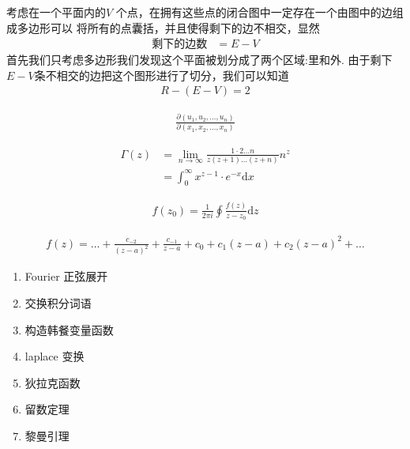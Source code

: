 \begin{thm}
考虑在一个平面内的$ V $ 个点，在拥有这些点的闭合图中一定存在一个由图中的边组成多边形可以
将所有的点囊括，并且使得剩下的边不相交，显然
\begin{align*}
		\text{剩下的边数}&= E-V 
\end{align*}
首先我们只考虑多边形我们发现这个平面被划分成了两个区域:里和外.
由于剩下$ E-V $条不相交的边把这个图形进行了切分，我们可以知道
 \begin{align*}
		R-(E-V) = 2
\end{align*}
\end{thm}
\begin{thm}
		\begin{align*}
				\frac{\partial (u_1,u_2,\ldots,u_n)}{\partial (x_1,x_2,\ldots,x_{n})} 
		\end{align*}
\end{thm}
\begin{thm}
		\begin{align*}
				\Gamma (z) &= \lim_{ n \to \infty} \frac{1 \cdot 2 \ldots n}{z(z+1)\ldots(z+n)}n^z \\
				&= \int_{ 0}^{\infty} x^{z-1} \cdot  e^{- x}\mathrm{d}x  
		\end{align*}
\end{thm}
\begin{thm}
\begin{align*}
	f(z_0) = \frac{1}{2\pi i}  \oint \frac{f(z)}{z-z_0}  \mathrm{d}z
\end{align*}
\end{thm}
\begin{thm}
\begin{align*}
		f(z) = \ldots+ \frac{c_{-2}}{(z-a)^2}  + \frac{c_{-1}}{z-a} + c_0 + c_1(z-a) + c_2(z-a)^2+\ldots
\end{align*}
\end{thm}
\ifx\allfiles\undefined

\fi

\begin{thm}[关于积分的菜谱]
		\begin{enumerate}
				\item Fourier 正弦展开
				\item 交换积分词语
				\item 构造韩餐变量函数
				\item laplace 变换
				\item 狄拉克函数
				\item 留数定理
				\item 黎曼引理
		\end{enumerate}
\end{thm}
